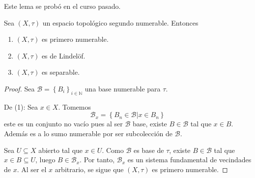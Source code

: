 \documentclass[12pt]{report}
\theoremstyle{largebreak}
\begin{document}
    Este lema se probó en el curso pasado.

    \begin{propo}
        Sea $(X,\tau)$ un espacio topológico segundo numerable. Entonces
        \begin{enumerate}
            \item $(X,\tau)$ es primero numerable.
            \item $(X,\tau)$ es de Lindelöf.
            \item $(X,\tau)$ es separable.
        \end{enumerate}
    \end{propo}

    \begin{proof}
        Sea $\mathcal{B}=\left\{B_i \right\}_{i\in\mathbb{N}}$ una base numerable para $\tau$.
        
        De (1): Sea $x\in X$. Tomemos
        \begin{equation*}
            \mathcal{B}_x=\left\{B_n\in\mathcal{B}\Big|x\in B_n \right\}
        \end{equation*}
        este es un conjunto no vacío pues al ser $\mathcal{B}$ base, existe $B\in\mathcal{B}$ tal que $x\in B$. Además es a lo sumo numerable por ser subcolección de $\mathcal{B}$.

        Sea $U\subseteq X$ abierto tal que $x\in U$. Como $\mathcal{B}$ es base de $\tau$, existe $B\in\mathcal{B}$ tal que $x\in B\subseteq U$, luego $B\in\mathcal{B}_x$. Por tanto, $\mathcal{B}_x$ es un sistema fundamental de vecindades de $x$. Al ser el $x$ arbitrario, se sigue que $(X,\tau)$ es primero numerable.


\end{proof}
\end{document}
